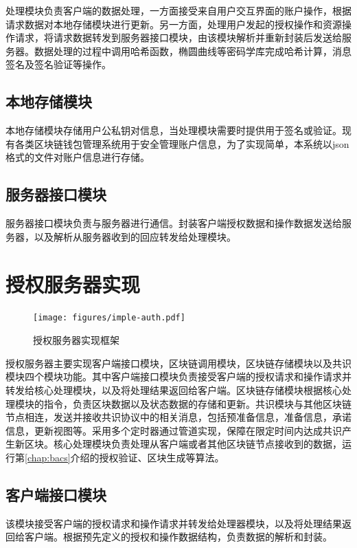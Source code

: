 处理模块负责客户端的数据处理，一方面接受来自用户交互界面的账户操作，根据请求数据对本地存储模块进行更新。另一方面，处理用户发起的授权操作和资源操作请求，将请求数据转发到服务器接口模块，由该模块解析并重新封装后发送给服务器。数据处理的过程中调用哈希函数，椭圆曲线等密码学库完成哈希计算，消息签名及签名验证等操作。

\subsection{本地存储模块}

本地存储模块存储用户公私钥对信息，当处理模块需要时提供用于签名或验证。现有各类区块链钱包管理系统用于安全管理账户信息，为了实现简单，本系统以json格式的文件对账户信息进行存储。

\subsection{服务器接口模块}

服务器接口模块负责与服务器进行通信。封装客户端授权数据和操作数据发送给服务器，以及解析从服务器收到的回应转发给处理模块。

\section{授权服务器实现}

\begin{figure}[H]
\centering
\texttt{[image: figures/imple-auth.pdf]}
\caption{授权服务器实现框架}
\label{fig:imple-auth}
\end{figure}

授权服务器主要实现客户端接口模块，区块链调用模块，区块链存储模块以及共识模块四个模块功能。其中客户端接口模块负责接受客户端的授权请求和操作请求并转发给核心处理模块，以及将处理结果返回给客户端。区块链存储模块根据核心处理模块的指令，负责区块数据以及状态数据的存储和更新。共识模块与其他区块链节点相连，发送并接收共识协议中的相关消息，包括预准备信息，准备信息，承诺信息，更新视图等。采用多个定时器通过管道实现，保障在限定时间内达成共识产生新区块。核心处理模块负责处理从客户端或者其他区块链节点接收到的数据，运行第\ref{chap:bacs}介绍的授权验证、区块生成等算法。

\subsection{客户端接口模块}

该模块接受客户端的授权请求和操作请求并转发给处理器模块，以及将处理结果返回给客户端。根据预先定义的授权和操作数据结构，负责数据的解析和封装。

